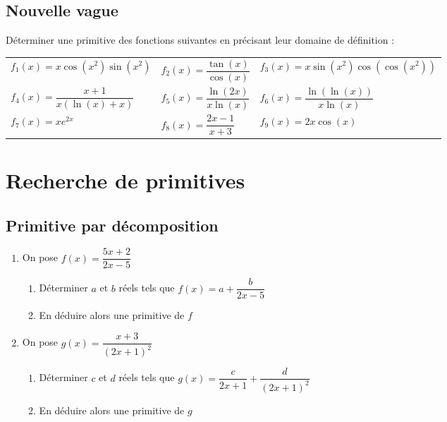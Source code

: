 \documentclass[oneside,12pt]{article}          %
\begin{document}
\subsection{Nouvelle vague}
Déterminer une primitive des fonctions suivantes en précisant leur domaine de définition :

\renewcommand{\arraystretch}{2}
\begin{tabular}{ p{} p{} p{} }
    $f_1(x)=x\cos(x^2)\sin(x^2)$ & $f_2(x)=\dfrac{\tan(x)}{\cos(x)}$ & $f_3(x)=x\sin(x^2)\cos(\cos(x^2))$ \\
    $f_4(x)=\dfrac{x+1}{x\left(\ln(x)+x\right)}$ & $f_5(x)=\dfrac{\ln(2x)}{x\ln(x)}$ & $f_6(x)=\dfrac{\ln\left(\ln(x)\right)}{x\ln(x)}$\\
    $f_7(x)=xe^{2x}$ & $f_8(x)=\dfrac{2x-1}{x+3}$ & $f_9(x)=2x\cos(x)$
\end{tabular}



\section{Recherche de primitives}

\subsection{Primitive par décomposition}
\begin{enumerate}
    \item On pose $f(x)=\dfrac{5x+2}{2x-5}$
    \begin{enumerate}
        \item Déterminer $a$ et $b$ réels tels que $f(x)=a+\dfrac{b}{2x-5}$
        \item En déduire alors une primitive de $f$
    \end{enumerate}
    \item On pose $g(x)=\dfrac{x+3}{(2x+1)^2}$
    \begin{enumerate}
        \item Déterminer $c$ et $d$ réels tels que $g(x)=\dfrac{c}{2x+1}+\dfrac{d}{(2x+1)^2}$
        \item En déduire alors une primitive de $g$
    \end{enumerate}
\end{enumerate}
\end{document}

